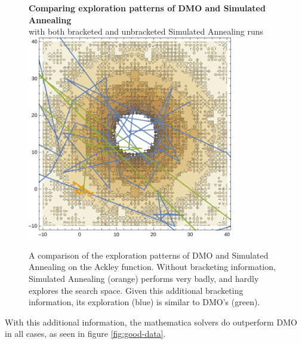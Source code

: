 \documentclass[12pt]{article}
\begin{document}
\begin{figure}[H]
    \begin{center}
        {\large {\bfseries Comparing exploration patterns of DMO and Simulated Annealing}\\
        with both bracketed and unbracketed Simulated Annealing runs}
        \includegraphics[width=0.8\textwidth]{../figures/ackley-dm-sa-bracketing-compare.pdf}

        \caption{
            A comparison of the exploration patterns of DMO and Simulated
            Annealing on the Ackley function. Without bracketing
            information, Simulated Annealing (orange) performs very badly,
            and hardly explores the search space. Given this additional
            bracketing information, its exploration (blue) is similar to
            DMO's (green).
        }
        \label{fig:dm-sa-bracket-exploration}
    \end{center}
\end{figure}


With this additional information, the mathematica solvers do outperform DMO
in all cases, as seen in figure \ref{fig:good-data}.
\end{document}
